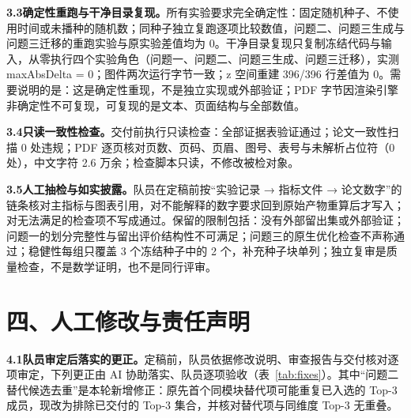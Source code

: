 \documentclass[11pt,a4paper]{article}
\begin{document}
\textbf{3.3\quad 确定性重跑与干净目录复现。}\quad 所有实验要求完全确定性：固定随机种子、不使用时间或未播种的随机数；同种子独立复跑逐项比较数值，问题二、问题三生成与问题三迁移的重跑实验与原实验差值均为 0。干净目录复现只复制冻结代码与输入，从零执行四个实验角色（问题一、问题二、问题三生成、问题三迁移），实测 maxAbsDelta = 0；图件两次运行字节一致；z 空间重建 396/396 行差值为 0。需要说明的是：这是确定性重现，不是独立实现或外部验证；PDF 字节因渲染引擎非确定性不可复现，可复现的是文本、页面结构与全部数值。

\textbf{3.4\quad 只读一致性检查。}\quad 交付前执行只读检查：全部证据表验证通过；论文一致性扫描 0 处违规；PDF 逐页核对页数、页码、页眉、图号、表号与未解析占位符（0 处），中文字符 2.6 万余；检查脚本只读，不修改被检对象。

\textbf{3.5\quad 人工抽检与如实披露。}\quad 队员在定稿前按“实验记录 → 指标文件 → 论文数字”的链条核对主指标与图表引用，对不能解释的数字要求回到原始产物重算后才写入；对无法满足的检查项不写成通过。保留的限制包括：没有外部留出集或外部验证；问题一的划分完整性与留出评价结构性不可满足；问题三的原生优化检查不声称通过；稳健性每组只覆盖 3 个冻结种子中的 2 个，补充种子块单列；独立复审是质量检查，不是数学证明，也不是同行评审。

\section*{四、人工修改与责任声明}

\textbf{4.1\quad 队员审定后落实的更正。}\quad 定稿前，队员依据修改说明、审查报告与交付核对逐项审定，下列更正由 AI 协助落实、队员逐项验收（表~\ref{tab:fixes}）。其中“问题二替代候选去重”是本轮新增修正：原先首个同模块替代项可能重复已入选的 Top-3 成员，现改为排除已交付的 Top-3 集合，并核对替代项与同维度 Top-3 无重叠。
\end{document}
